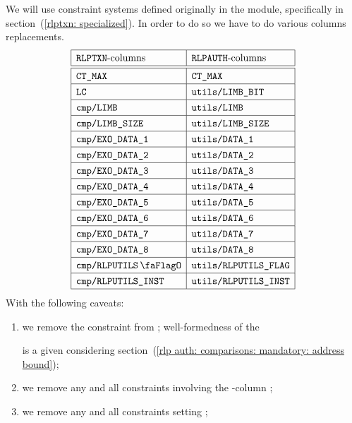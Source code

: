 We will use constraint systems defined originally in
the \rlpTxnMod{} module, specifically
in section~(\ref{rlptxn: specialized}).
In order to do so we have to do various columns replacements.
\[
	\renewcommand{\arraystretch}{1.3}
	\begin{array}{|l|l|}
		\hline
		\text{\rlpTxnMod{}-columns}                 & \text{\rlpAuthMod{}-columns}           \\ \hline\hline
		\maxCt                                      & \maxCt                                 \\ \hline      
		\lc                                         & \rlpAuthUtilsColumnLimbBit             \\ \hline      
		\rlpTxnComputationColumnLimb                & \rlpAuthUtilsColumnLimb                \\ \hline      
		\rlpTxnComputationColumnLimbSize            & \rlpAuthUtilsColumnLimbSize            \\ \hline      
		\rlpTxnComputationColumnExoDataColumn{1}    & \rlpAuthUtilsColumnExoDataColumn{1}    \\ \hline      
		\rlpTxnComputationColumnExoDataColumn{2}    & \rlpAuthUtilsColumnExoDataColumn{2}    \\ \hline      
		\rlpTxnComputationColumnExoDataColumn{3}    & \rlpAuthUtilsColumnExoDataColumn{3}    \\ \hline      
		\rlpTxnComputationColumnExoDataColumn{4}    & \rlpAuthUtilsColumnExoDataColumn{4}    \\ \hline      
		\rlpTxnComputationColumnExoDataColumn{5}    & \rlpAuthUtilsColumnExoDataColumn{5}    \\ \hline      
		\rlpTxnComputationColumnExoDataColumn{6}    & \rlpAuthUtilsColumnExoDataColumn{6}    \\ \hline      
		\rlpTxnComputationColumnExoDataColumn{7}    & \rlpAuthUtilsColumnExoDataColumn{7}    \\ \hline      
		\rlpTxnComputationColumnExoDataColumn{8}    & \rlpAuthUtilsColumnExoDataColumn{8}    \\ \hline      
		\rlpTxnComputationColumnRlpUtilsFlag        & \rlpAuthUtilsColumnRlpUtilsFlag        \\ \hline      
		\rlpTxnComputationColumnRlpUtilsInstruction & \rlpAuthUtilsColumnRlpUtilsInstruction \\ \hline      
	\end{array}
\]
With the following caveats:
\begin{enumerate}
	\item
		we remove the \rlpTxnComputationColumnTrmFlag{} constraint from \rlpProcessAddressName{};
		well-formedness of the \address{} is a given considering
		section~(\ref{rlp auth: comparisons: mandatory: address bound});
	\item
		we remove any and all constraints involving the \rlpTxnMod{}-column \phaseEnd{};
	\item
		we remove any and all constraints setting \maxCt{};
\end{enumerate}
